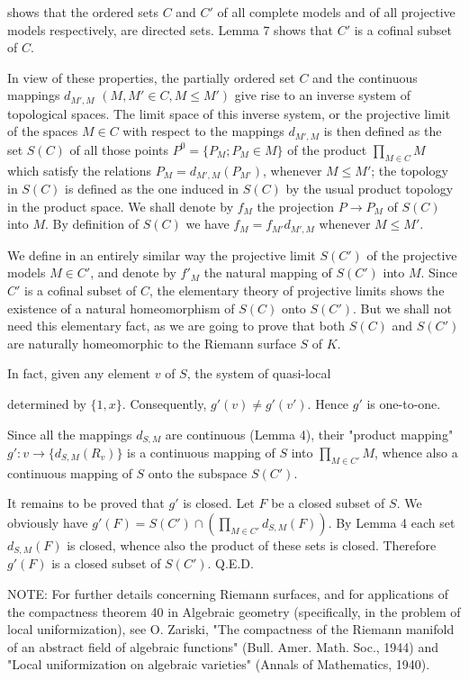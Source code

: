 shows that the ordered sets $C$ and $C'$ of all complete models and of all projective models respectively, are directed sets. Lemma 7 shows that $C'$ is a cofinal subset of $C$.

In view of these properties, the partially ordered set $C$ and the continuous mappings $d_{M',M}$ $(M, M' \in C, M \leq M')$ give rise to an inverse system of topological spaces. The limit space of this inverse system, or the projective limit of the spaces $M \in C$ with respect to the mappings $d_{M',M}$ is then defined as the set $S(C)$ of all those points $P^0 = \{P_M; P_M \in M\}$ of the product $\prod_{M \in C} M$ which satisfy the relations $P_M = d_{M',M}(P_{M'})$, whenever $M \leq M'$; the topology in $S(C)$ is defined as the one induced in $S(C)$ by the usual product topology in the product space. We shall denote by $f_M$ the projection $P \rightarrow P_M$ of $S(C)$ into $M$. By definition of $S(C)$ we have $f_M = f_{M'} d_{M',M}$ whenever $M \leq M'$.

We define in an entirely similar way the projective limit $S(C')$ of the projective models $M \in C'$, and denote by $f'_M$ the natural mapping of $S(C')$ into $M$. Since $C'$ is a cofinal subset of $C$, the elementary theory of projective limits shows the existence of a natural homeomorphism of $S(C)$ onto $S(C')$. But we shall not need this elementary fact, as we are going to prove that both $S(C)$ and $S(C')$ are naturally homeomorphic to the Riemann surface $S$ of $K$.

In fact, given any element $v$ of $S$, the system of quasi-local

determined by $\{1, x\}$. Consequently, $g'(v) \neq g'(v')$. Hence $g'$ is one-to-one.

Since all the mappings $d_{S,M}$ are continuous (Lemma 4), their "product mapping" $g' : v \rightarrow \{d_{S,M}(R_v)\}$ is a continuous mapping of $S$ into $\prod_{M \in C'} M$, whence also a continuous mapping of $S$ onto the subspace $S(C')$.

It remains to be proved that $g'$ is closed. Let $F$ be a closed subset of $S$. We obviously have $g'(F) = S(C') \cap \left(\prod_{M \in C'} d_{S,M}(F)\right)$. By Lemma 4 each set $d_{S,M}(F)$ is closed, whence also the product of these sets is closed. Therefore $g'(F)$ is a closed subset of $S(C')$. Q.E.D.

NOTE: For further details concerning Riemann surfaces, and for applications of the compactness theorem 40 in Algebraic geometry (specifically, in the problem of local uniformization), see O. Zariski, "The compactness of the Riemann manifold of an abstract field of algebraic functions" (Bull. Amer. Math. Soc., 1944) and "Local uniformization on algebraic varieties" (Annals of Mathematics, 1940).

